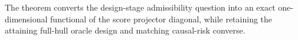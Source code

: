 The theorem converts the design-stage admissibility question into an exact one-dimensional functional of the score projector diagonal, while retaining the attaining full-hull oracle design and matching causal-risk converse.